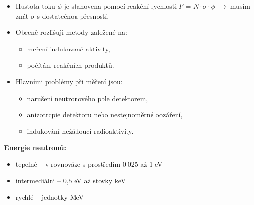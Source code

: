 \begin{itemize}
    \item Hustota toku $\phi$ je stanovena pomocí reakční rychlosti $F$ = $N \cdot \sigma \cdot \phi$ $\rightarrow$ musím znát $\sigma$ s dostatečnou přesností.
    \item Obecně rozlišuji metody založené na:
    
    \begin{itemize}
        \item meření indukované aktivity,
        \item počítání reakčních produktů.
    \end{itemize}

    \item Hlavními problémy při měření jsou:
    
    \begin{itemize}
        \item narušení neutronového pole detektorem,
        \item anizotropie detektoru nebo nestejnoměrné oozáření,
        \item indukování nežádoucí radioaktivity.
    \end{itemize}

\end{itemize}

\textbf{Energie neutronů:}  

\begin{itemize}
    \item tepelné -- v rovnováze s prostředím 0,025 až 1 eV
    \item intermediální -- 0,5 eV až stovky keV
    \item rychlé -- jednotky MeV
\end{itemize}

